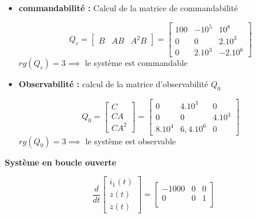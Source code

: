 {{{{\begin{itemize}
\begin{center}
    \end{center} 
    \item \textbf{commandabilité : } Calcul de la matrice de commandabilité \newline
    \begin{center}
        \[
        Q_{c} = 
        \begin{bmatrix}
            B & AB & A^{2}B
        \end{bmatrix}
        =
        \begin{bmatrix}
            100 & -10^{5} & 10^{8} \\
            0   & 0       & 2.10^{3} \\
            0   & 2.10^{3}& -2.10^{6}
        \end{bmatrix}
        \]
        \newline
        $
        rg(Q_{c}) = 3 \implies
        $ le système est commandable
    \end{center}
    \item \textbf{Observabilité : } calcul de la matrice d'observabilité $Q_{0}$
    \begin{center}
        \[
        Q_{0} = 
        \begin{bmatrix}
            C \\
            CA \\
            CA^{2}
        \end{bmatrix}
        =
        \begin{bmatrix}
            0       & 4.10^{3}  & 0 \\
            0       & 0         & 4.10^{3} \\
            8.10^{4}& 6,4.10^{6}& 0
        \end{bmatrix}
        \]
        \newline
        $
        rg(Q_{0}) = 3 \implies
        $ le système est observable
    \end{center}    
\end{itemize}
\textbf{Système en boucle ouverte}
\begin{center}
    \[
    \frac{d}{dt}
    \begin{bmatrix}
    i_{1}(t) \\
    z(t) \\
    \dot{z}(t)    
    \end{bmatrix}
    =
    \begin{bmatrix}
        -1000 & 0    & 0 \\
        0     & 0    & 1 \\

\end{bmatrix}\]
\end{center}}}}}
